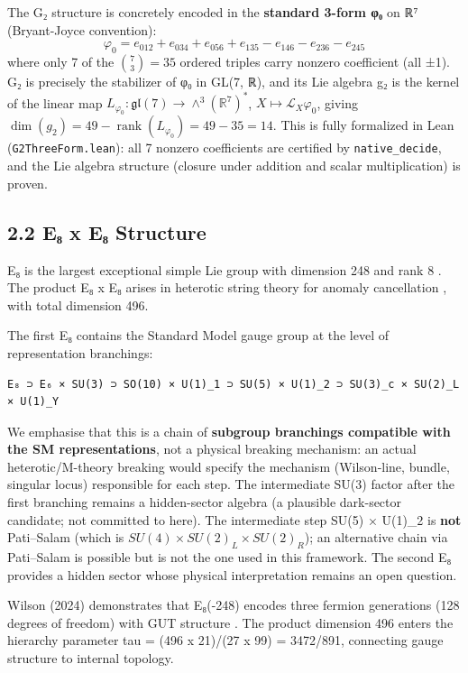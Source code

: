 \documentclass[11pt,a4paper]{article}
\begin{document}
The G₂ structure is concretely encoded in the \textbf{standard 3-form φ₀} on ℝ⁷ (Bryant-Joyce convention): \[\varphi_0 = e_{012} + e_{034} + e_{056} + e_{135} - e_{146} - e_{236} - e_{245}\] where only 7 of the \(\binom{7}{3} = 35\) ordered triples carry nonzero coefficient (all ±1). G₂ is precisely the stabilizer of φ₀ in GL(7, ℝ), and its Lie algebra g₂ is the kernel of the linear map \(L_{\varphi_0} : \mathfrak{gl}(7) \to \wedge^3(\mathbb{R}^7)^*\), \(X \mapsto \mathcal{L}_X \varphi_0\), giving \(\dim(g_2) = 49 - \operatorname{rank}(L_{\varphi_0}) = 49 - 35 = 14\). This is fully formalized in Lean (\texttt{G2Three\allowbreak{}Form.\allowbreak{}lean}): all 7 nonzero coefficients are certified by \texttt{native\_\allowbreak{}decide}, and the Lie algebra structure (closure under addition and scalar multiplication) is proven.

\subsection{2.2 E₈ x E₈ Structure}\label{eux2088-x-eux2088-structure}

E₈ is the largest exceptional simple Lie group with dimension 248 and rank 8 \cite{18}. The product E₈ x E₈ arises in heterotic string theory for anomaly cancellation \cite{19}, with total dimension 496.

The first E₈ contains the Standard Model gauge group at the level of representation branchings:

\begin{verbatim}
E₈ ⊃ E₆ × SU(3) ⊃ SO(10) × U(1)_1 ⊃ SU(5) × U(1)_2 ⊃ SU(3)_c × SU(2)_L × U(1)_Y
\end{verbatim}

We emphasise that this is a chain of \textbf{subgroup branchings compatible with the SM representations}, not a physical breaking mechanism: an actual heterotic/M-theory breaking would specify the mechanism (Wilson-line, bundle, singular locus) responsible for each step. The intermediate SU(3) factor after the first branching remains a hidden-sector algebra (a plausible dark-sector candidate; not committed to here). The intermediate step SU(5) × U(1)\_\allowbreak{}2 is \textbf{not} Pati--Salam (which is \(SU(4) \times SU(2)_L \times SU(2)_R\)); an alternative chain via Pati--Salam is possible but is not the one used in this framework. The second E₈ provides a hidden sector whose physical interpretation remains an open question.

Wilson (2024) demonstrates that E₈(-248) encodes three fermion generations (128 degrees of freedom) with GUT structure \cite{9}. The product dimension 496 enters the hierarchy parameter tau = (496 x 21)/(27 x 99) = 3472/891, connecting gauge structure to internal topology.
\end{document}
